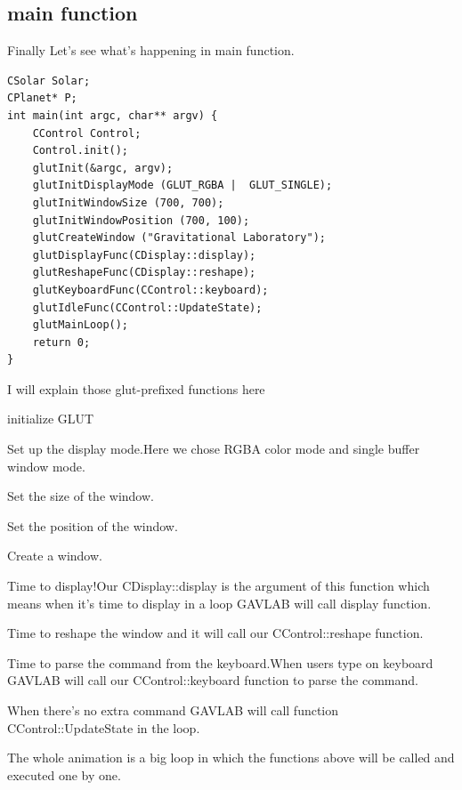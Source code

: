 \documentclass[12pt]{article}
\begin{document}
\subsection{main function}

Finally Let's see what's happening in main function.\\
\begin{lstlisting}[caption=main()]
CSolar Solar;
CPlanet* P;
int main(int argc, char** argv) {
    CControl Control;
    Control.init();
    glutInit(&argc, argv);
    glutInitDisplayMode (GLUT_RGBA |  GLUT_SINGLE);
    glutInitWindowSize (700, 700);
    glutInitWindowPosition (700, 100);
    glutCreateWindow ("Gravitational Laboratory");
    glutDisplayFunc(CDisplay::display);
    glutReshapeFunc(CDisplay::reshape);
    glutKeyboardFunc(CControl::keyboard);
    glutIdleFunc(CControl::UpdateState);
    glutMainLoop();
    return 0;
}
\end{lstlisting}
\clearpage
I will explain those glut-prefixed functions here
\begin{description}[align=left]
\item [glutInit] initialize GLUT 
\item [glutInitDisplayMode] Set up the display mode.Here we chose RGBA color mode and single buffer window mode.
\item [glutInitWindowSize] Set the size of the window.
\item [glutInitWindowPosition] Set the position of the window.
\item [glutCreateWindow] Create a window.
\item [glutDisplayFunc] Time to display!Our CDisplay::display is the argument of this function which means when it's time to display in
a loop GAVLAB will call display function.
\item [glutReshapeFunc] Time to reshape the window and it will call our CControl::reshape function.
\item [glutKeyboardFunc] Time to parse the command from the keyboard.When users type on keyboard GAVLAB will call our CControl::keyboard function
to parse the command.
\item [glutIdleFunc] When there's no extra command GAVLAB will call function CControl::UpdateState in the loop.
\item [glutMainLoop] The whole animation is a big loop in which the functions above will be called and executed one by one.

\end{description}
\end{document}
